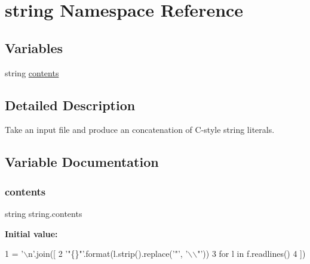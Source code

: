 \hypertarget{namespacestring}{}\section{string Namespace Reference}
\label{namespacestring}
\subsection*{Variables}
\begin{DoxyCompactItemize}
\item 
string \mbox{\hyperlink{namespacestring_ac3a0eac796909f16fb4fcf5a8be33ce2}{contents}}
\end{DoxyCompactItemize}


\subsection{Detailed Description}
\begin{DoxyVerb}Take an input file and produce an concatenation of C-style string literals.
\end{DoxyVerb}
 

\subsection{Variable Documentation}
\mbox{\label{namespacestring_ac3a0eac796909f16fb4fcf5a8be33ce2}} 
\subsubsection{\texorpdfstring{contents}{contents}}
{\footnotesize\ttfamily string string.\+contents}

{\bfseries Initial value\+:}
\begin{DoxyCode}
1 =  \textcolor{stringliteral}{'\(\backslash\)n'}.join([
2         \textcolor{stringliteral}{'"\{\}"'}.format(l.strip().replace(\textcolor{stringliteral}{'"'}, \textcolor{stringliteral}{'\(\backslash\)\(\backslash\)"'}))
3         \textcolor{keywordflow}{for} l \textcolor{keywordflow}{in} f.readlines()
4     ])
\end{DoxyCode}
